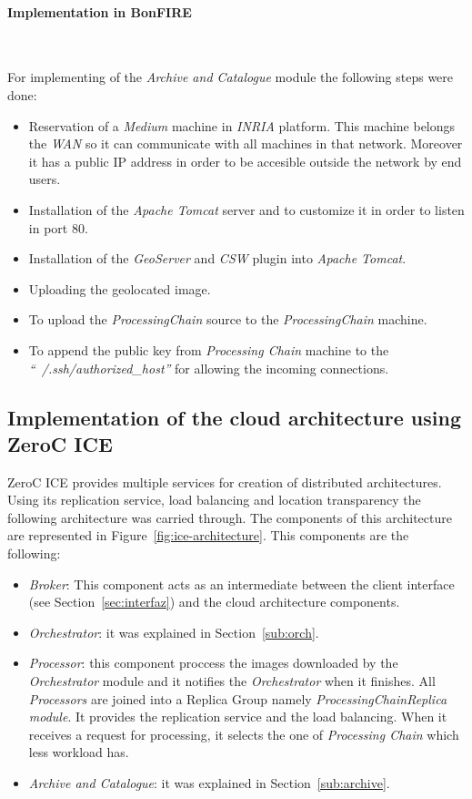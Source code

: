 \paragraph{Implementation in BonFIRE}~\\
\label{para:bonfire-impl-cat}


For implementing of the \emph{Archive and Catalogue} module the following steps were done:

\begin{itemize}
 \item Reservation of a \emph{Medium} machine in \emph{INRIA} \bonfire
   platform. This machine belongs the \bonfire \emph{WAN} so it can communicate
   with all machines in that network. Moreover it has a public \ac{IP} address
   in order to be accesible outside the \bonfire network by end users. 
 \item Installation of the \emph{Apache Tomcat} server and to customize it in
   order to listen in port 80.
 \item Installation of the \emph{GeoServer} and \emph{CSW} plugin into
   \emph{Apache Tomcat}.
 \item Uploading the geolocated image.
 \item To upload the \emph{ProcessingChain} source to the \emph{ProcessingChain}
   machine.
 \item To append the public key from \emph{Processing Chain} machine to the
   \emph{``~/.ssh/authorized\_host''} for
   allowing the incoming connections.
\end{itemize}


\subsection{Implementation of the cloud architecture using ZeroC ICE}

ZeroC ICE provides multiple services for creation of distributed
architectures. Using its replication service, load balancing and location
transparency the following architecture was carried through. The components of
this architecture are represented in Figure~\ref{fig:ice-architecture}. This components are the
following:

\begin{itemize}
\item \emph{Broker}: This component acts as an intermediate between the client
  interface (see Section~\ref{sec:interfaz}) and the cloud architecture
  components. 
\item \emph{Orchestrator}: it was explained in Section~\ref{sub:orch}.
\item \emph{Processor}: this component proccess the images downloaded by the
  \emph{Orchestrator} module and it notifies the \emph{Orchestrator} when it
  finishes. All \emph{Processors} are joined into a Replica Group namely
  \emph{ProcessingChainReplica module}. It provides the replication service and the load
  balancing. When it receives a request for processing, it selects the one of \emph{Processing Chain} which less workload has.
\item \emph{Archive and Catalogue}: it was explained in Section~\ref{sub:archive}.
\end{itemize}

